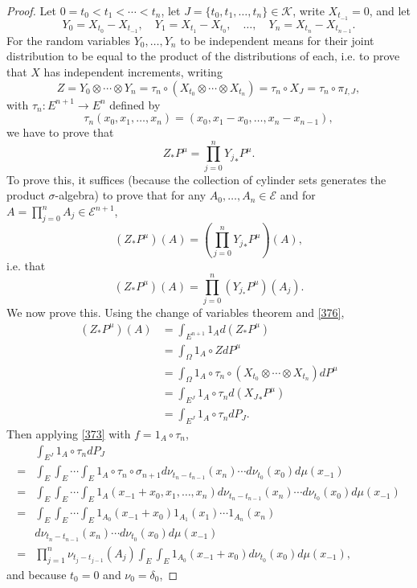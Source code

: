\documentclass{article}
\theoremstyle{definition}
\theoremstyle{definition}
\begin{document}
\begin{proof}
Let $0=t_0<t_1<\cdots<t_n$, let $J=\{t_0,t_1,\ldots,t_n\} \in \mathscr{K}$, write $X_{t_{-1}}=0$, and let
\[
Y_0=X_{t_0}-X_{t_{-1}}, \quad Y_1=X_{t_1}-X_{t_0}, \quad \ldots, \quad Y_n=X_{t_n}-X_{t_{n-1}}.
\]
For the random variables $Y_0,\ldots,Y_n$ to be independent means for their joint distribution to be equal to the product of the distributions of each, i.e.
to prove that $X$ has independent increments, writing
\[
Z = Y_0 \otimes \cdots \otimes Y_n = \tau_n \circ (X_{t_0} \otimes \cdots \otimes X_{t_n}) = \tau_n \circ X_J = \tau_n
\circ \pi_{I,J},
\]
with $\tau_n:E^{n+1} \to E^n$ defined by
\[
\tau_n(x_0,x_1,\ldots,x_n)=(x_0,x_1-x_0,\ldots,x_n-x_{n-1}),
\]
we have to prove that
\[
Z_* P^\mu = \prod_{j=0}^n {Y_j}_* P^\mu.
\]
To prove this, it suffices (because the collection of cylinder sets generates the product
$\sigma$-algebra) to prove that for  any
$A_0,\ldots,A_n \in \mathscr{E}$ and for $A = \prod_{j=0}^n A_j \in \mathscr{E}^{n+1}$,
\[
(Z_* P^\mu)(A) = \left( \prod_{j=0}^n {Y_j}_* P^\mu\right)(A),
\]
i.e. that 
\[
(Z_* P^\mu)(A) = \prod_{j=0}^n (Y_{j_*}P^\mu)(A_j).
\]
We now prove this. Using the change of variables theorem and \eqref{376},
\begin{align*}
(Z_* P^\mu)(A)&=\int_{E^{n+1}} 1_A d(Z_*P^\mu)\\
&=\int_\Omega 1_A \circ Z dP^\mu\\
&=\int_\Omega 1_A \circ \tau_n \circ (X_{t_0} \otimes \cdots \otimes X_{t_n}) dP^\mu\\
&=\int_{E^J} 1_A \circ \tau_n d({X_J}_*P^\mu)\\
&=\int_{E^J} 1_A \circ \tau_n dP_J.
\end{align*}
Then applying  \eqref{373} with $f=1_A \circ \tau_n$,
\[
\begin{split}
&\int_{E^J} 1_A \circ \tau_n dP_J\\
=&\int_E \int_E \cdots \int_E 1_A \circ \tau_n \circ \sigma_{n+1} 
d\nu_{t_n-t_{n-1}}(x_n) \cdots d\nu_{t_0}(x_0) d\mu(x_{-1})\\
=&\int_E \int_E \cdots \int_E 1_A(x_{-1}+x_0,x_1,\ldots,x_n) d\nu_{t_n-t_{n-1}}(x_n) \cdots d\nu_{t_0}(x_0) d\mu(x_{-1})\\
=&\int_E \int_E \cdots \int_E 1_{A_0}(x_{-1}+x_0) 1_{A_1}(x_1) \cdots 1_{A_n}(x_n)\\
&d\nu_{t_n-t_{n-1}}(x_n) \cdots d\nu_{t_0}(x_0) d\mu(x_{-1})\\
=&\prod_{j=1}^n \nu_{t_j-t_{j-1}}(A_j) \int_E \int_E 1_{A_0}(x_{-1}+x_0) d\nu_{t_0}(x_0) d\mu(x_{-1}),
\end{split}
\]
and because $t_0=0$ and $\nu_0=\delta_0$,

\end{proof}
\end{document}
